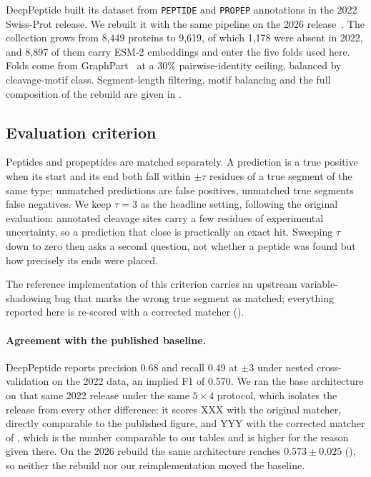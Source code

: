 \documentclass{article}
\begin{document}
DeepPeptide built its dataset from \texttt{PEPTIDE} and \texttt{PROPEP} annotations in the 2022 Swiss-Prot release. We rebuilt it with the same pipeline on the 2026 release~\citep{uniprot2025}. The collection grows from 8{,}449 proteins to 9{,}619, of which 1{,}178 were absent in 2022, and 8{,}897 of them carry ESM-2 embeddings and enter the five folds used here. Folds come from GraphPart~\citep{graphpart2023} at a 30\% pairwise-identity ceiling, balanced by cleavage-motif class. Segment-length filtering, motif balancing and the full composition of the rebuild are given in .

\subsection{Evaluation criterion}
\label{sec:matching}

Peptides and propeptides are matched separately. A prediction is a true positive when its start and its end both fall within $\pm\tau$ residues of a true segment of the same type; unmatched predictions are false positives, unmatched true segments false negatives. We keep $\tau=3$ as the headline setting, following the original evaluation: annotated cleavage sites carry a few residues of experimental uncertainty, so a prediction that close is practically an exact hit. Sweeping $\tau$ down to zero then asks a second question, not whether a peptide was found but how precisely its ends were placed.

The reference implementation of this criterion carries an upstream variable-shadowing bug that marks the wrong true segment as matched; everything reported here is re-scored with a corrected matcher ().

\paragraph{Agreement with the published baseline.} DeepPeptide reports precision 0.68 and recall 0.49 at $\pm3$ under nested cross-validation on the 2022 data, an implied F1 of 0.570. We ran the base architecture on that same 2022 release under the same $5\times4$ protocol, which isolates the release from every other difference: it scores XXX with the original matcher, directly comparable to the published figure, and YYY with the corrected matcher of , which is the number comparable to our tables and is higher for the reason given there. On the 2026 rebuild the same architecture reaches $0.573\pm0.025$ (), so neither the rebuild nor our reimplementation moved the baseline.
\end{document}
